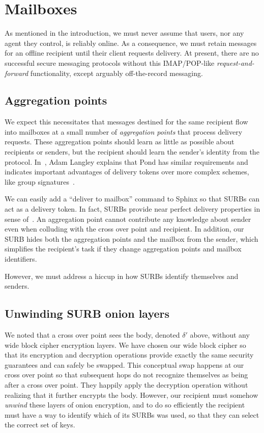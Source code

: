 
\section{Mailboxes}

As mentioned in the introduction, we must never assume that users,
nor any agent they control, is reliably online.  
As a consequence, we must retain messages for an offline recipient
until their client requests delivery.  
At present, there are no successful secure messaging protocols
without this IMAP/POP-like {\em request-and-forward} functionality,
except arguably off-the-record messaging. 


\subsection{Aggregation points}

We expect this necessitates that messages destined for the same
recipient flow into mailboxes at a small number of {\em aggregation
points} that process delivery requests.  These aggregation points 
should learn as little as possible about recipients or senders, but
the recipient should learn the sender's identity from the protocol.
In~\cite{agl-pond-hmac}, Adam Langley explains that Pond has similar
requirements and indicates important advantages of delivery tokens
over more complex schemes, like group signatures~\cite{VLR,BBS}.

We can easily add a ``deliver to mailbox'' command to Sphinx so that
SURBs can act as a delivery token.  In fact, SURBs provide near
perfect delivery properties in sense of~\cite{warner-delivery}.
An aggregation point cannot contribute any knowledge about sender
even when colluding with the cross over point and recipient.
In addition, our SURB hides both the aggregation points and the
mailbox from the sender, which simplifies the recipient's task if
they change aggregation points and mailbox identifiers.

However, we must address a hiccup in how SURBs identify themselves
and senders.

\subsection{Unwinding SURB onion layers}

We noted that a cross over point sees the body, denoted $\delta'$
above, without any wide block cipher encryption layers.  We have
chosen our wide block cipher so that its encryption and decryption
operations provide exactly the same security guarantees and can
safely be swapped.  This conceptual swap happens at our cross over
point so that subsequent hops do not recognize themselves as being
after a cross over point.  They happily apply the decryption
operation without realizing that it further encrypts the body.
However, our recipient must somehow {\em unwind} these layers of
onion encryption, and to do so efficiently the recipient must have
a way to identify which of its SURBs was used, so that they
can select the correct set of keys.

